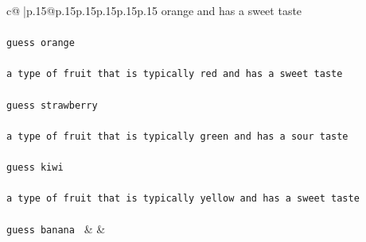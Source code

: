 \documentclass{article}
\begin{document}
{\begin{supertabular}{c@{$\;$}|p{.15\linewidth}@{}p{.15\linewidth}p{.15\linewidth}p{.15\linewidth}p{.15\linewidth}p{.15\linewidth}}
{{{orange and has a sweet taste\\ \tt \\ \tt guess orange\\ \tt \\ \tt  a type of fruit that is typically red and has a sweet taste\\ \tt \\ \tt guess strawberry\\ \tt \\ \tt  a type of fruit that is typically green and has a sour taste\\ \tt \\ \tt guess kiwi\\ \tt \\ \tt  a type of fruit that is typically yellow and has a sweet taste\\ \tt \\ \tt guess banana 
	  } 
	   } 
	   } 
	 & & \\ 
 

    \theutterance {}  


\end{supertabular}}
\end{document}
